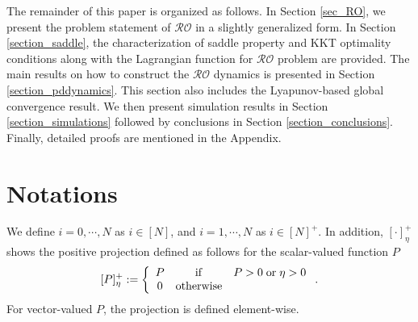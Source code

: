 \documentclass[journal,twoside,web]{ieeecolor}
\begin{document}
The remainder of this paper is organized as follows. In Section \ref{sec_RO}, we present the problem statement of $\mathcal{RO}$ in a slightly generalized form. In Section \ref{section_saddle}, the characterization of saddle property and KKT optimality conditions along with the Lagrangian function for $\mathcal{RO}$ problem are provided. The main results on how to construct the $\mathcal{RO}$ dynamics is presented in Section \ref{section_pddynamics}. This section also includes the Lyapunov-based global convergence result. We then present simulation results in Section \ref{section_simulations} followed by conclusions in Section \ref{section_conclusions}.
Finally, detailed proofs are mentioned in the Appendix.

\section{Notations}\label{notations}

We define $i=0,\cdots,N$ as $i\in[N]$, and $i=1,\cdots,N$ as $i\in[N]^+$. In addition, $\left[\cdot\right]_\eta^+$ shows the positive projection defined as follows for the scalar-valued function $P$
\begin{align} \label{proj}
[P]_\eta^+:=\left\{\begin{array}{ccl}P&{\rm if}& P>0 \;{\rm or} \;\eta>0\\
0&{\rm otherwise}
\end{array}\right..
\end{align}
For vector-valued $P$, the projection is defined element-wise.
\end{document}
